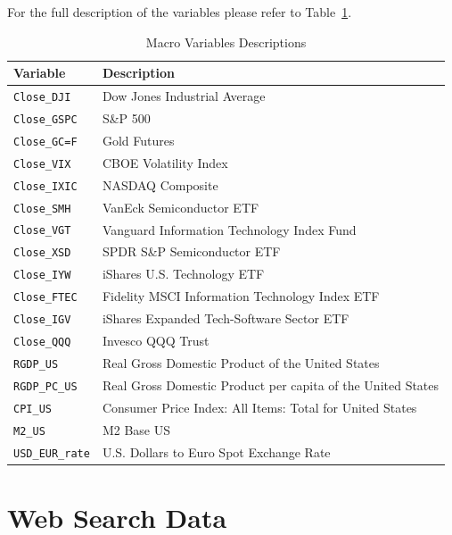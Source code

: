 For the full description of 
the variables please refer to Table~\ref{tab:variables_macro}.

\begin{table}[htbp]
    \centering
    \begin{threeparttable}
    \caption{Macro Variables Descriptions}
    \label{tab:variables_macro}
    \begin{tabular}{ll}
    \toprule
    \textbf{Variable} & \textbf{Description} \\
    \midrule
    \texttt{Close\_DJI} & Dow Jones Industrial Average \\
    \texttt{Close\_GSPC} & S\&P 500 \\
    \texttt{Close\_GC=F} & Gold Futures \\
    \texttt{Close\_VIX} & CBOE Volatility Index \\
    \texttt{Close\_IXIC} & NASDAQ Composite \\
    \texttt{Close\_SMH} & VanEck Semiconductor ETF \\
    \texttt{Close\_VGT} & Vanguard Information Technology Index Fund \\
    \texttt{Close\_XSD} & SPDR S\&P Semiconductor ETF \\
    \texttt{Close\_IYW} & iShares U.S. Technology ETF \\
    \texttt{Close\_FTEC} & Fidelity MSCI Information Technology Index ETF \\
    \texttt{Close\_IGV} & iShares Expanded Tech-Software Sector ETF \\
    \texttt{Close\_QQQ} & Invesco QQQ Trust \\
    \texttt{RGDP\_US} & Real Gross Domestic Product of the United States \\
    \texttt{RGDP\_PC\_US} & Real Gross Domestic Product per capita 
    of the United States \\
    \texttt{CPI\_US} & Consumer Price Index: All Items: Total for United States \\
    \texttt{M2\_US} & M2 Base US \\
    \texttt{USD\_EUR\_rate} & U.S. Dollars to Euro Spot Exchange Rate \\
    \bottomrule
    \end{tabular}
    \end{threeparttable}
\end{table}

\section{Web Search Data}

